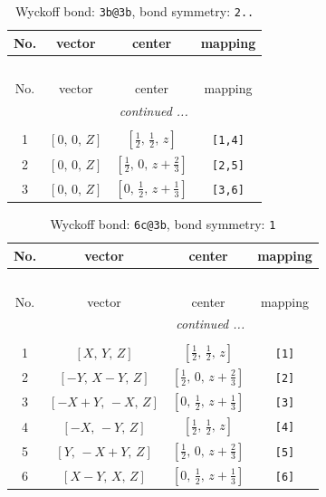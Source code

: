 \documentclass[fleqn,8pt]{jsarticle}
\begin{document}
\renewcommand{\arraystretch}{1.2}
\begin{longtable}{cccc}
\caption{Wyckoff bond: {\tt 3b@3b}, bond symmetry: {\tt 2..}}
 \\
 \hline \hline
No. & vector & center & mapping \\ \hline \endfirsthead

\multicolumn{3}{l}{\tablename\ \thetable{}} \\
 \hline \hline
No. & vector & center & mapping \\ \hline \endhead

 \hline \hline
\multicolumn{3}{r}{\footnotesize\it continued ...} \\ \endfoot

 \hline \hline
\multicolumn{3}{r}{} \\ \endlastfoot

1 & $\left[ 0,\, 0,\, Z \right]$ & $\left[ \frac{1}{2},\, \frac{1}{2},\, z \right]$ & {\tt [1,4]} \\ \hline
2 & $\left[ 0,\, 0,\, Z \right]$ & $\left[ \frac{1}{2},\, 0,\, z + \frac{2}{3} \right]$ & {\tt [2,5]} \\ \hline
3 & $\left[ 0,\, 0,\, Z \right]$ & $\left[ 0,\, \frac{1}{2},\, z + \frac{1}{3} \right]$ & {\tt [3,6]} \\
\end{longtable}
\renewcommand{\arraystretch}{1.2}
\begin{longtable}{cccc}
\caption{Wyckoff bond: {\tt 6c@3b}, bond symmetry: {\tt 1}}
 \\
 \hline \hline
No. & vector & center & mapping \\ \hline \endfirsthead

\multicolumn{3}{l}{\tablename\ \thetable{}} \\
 \hline \hline
No. & vector & center & mapping \\ \hline \endhead

 \hline \hline
\multicolumn{3}{r}{\footnotesize\it continued ...} \\ \endfoot

 \hline \hline
\multicolumn{3}{r}{} \\ \endlastfoot

1 & $\left[ X,\, Y,\, Z \right]$ & $\left[ \frac{1}{2},\, \frac{1}{2},\, z \right]$ & {\tt [1]} \\ \hline
2 & $\left[ - Y,\, X - Y,\, Z \right]$ & $\left[ \frac{1}{2},\, 0,\, z + \frac{2}{3} \right]$ & {\tt [2]} \\ \hline
3 & $\left[ - X + Y,\, - X,\, Z \right]$ & $\left[ 0,\, \frac{1}{2},\, z + \frac{1}{3} \right]$ & {\tt [3]} \\ \hline
4 & $\left[ - X,\, - Y,\, Z \right]$ & $\left[ \frac{1}{2},\, \frac{1}{2},\, z \right]$ & {\tt [4]} \\ \hline
5 & $\left[ Y,\, - X + Y,\, Z \right]$ & $\left[ \frac{1}{2},\, 0,\, z + \frac{2}{3} \right]$ & {\tt [5]} \\ \hline
6 & $\left[ X - Y,\, X,\, Z \right]$ & $\left[ 0,\, \frac{1}{2},\, z + \frac{1}{3} \right]$ & {\tt [6]} \\
\end{longtable}
\end{document}
